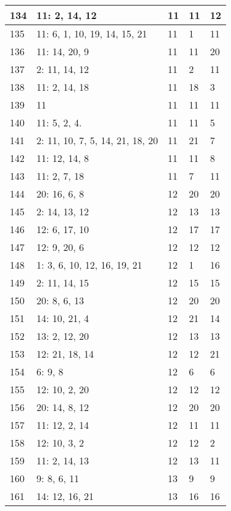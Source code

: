 \documentclass{article} %
\begin{document}
\begin{longtable}{| l | l | l | l | l |}
        134 & 11: 2, 14, 12 & 11 & 11 & 12 \\ \hline
        135 & 11: 6, 1, 10, 19, 14, 15, 21 & 11 & 1 & 11 \\ \hline
        136 & 11: 14, 20, 9 & 11 & 11 & 20 \\ \hline
        137 & 2: 11, 14, 12 & 11 & 2 & 11 \\ \hline
        138 & 11: 2, 14, 18 & 11 & 18 & 3 \\ \hline
        139 & 11 & 11 & 11 & 11 \\ \hline
        140 & 11: 5, 2, 4. & 11 & 11 & 5 \\ \hline
        141 & 2: 11, 10, 7, 5, 14, 21, 18, 20 & 11 & 21 & 7 \\ \hline
        142 & 11: 12, 14, 8 & 11 & 11 & 8 \\ \hline
        143 & 11: 2, 7, 18 & 11 & 7 & 11 \\ \hline
        144 & 20: 16, 6, 8 & 12 & 20 & 20 \\ \hline
        145 & 2: 14, 13, 12 & 12 & 13 & 13 \\ \hline
        146 & 12: 6, 17, 10 & 12 & 17 & 17 \\ \hline
        147 & 12: 9, 20, 6 & 12 & 12 & 12 \\ \hline
        148 & 1: 3, 6, 10, 12, 16, 19, 21 & 12 & 1 & 16 \\ \hline
        149 & 2: 11, 14, 15 & 12 & 15 & 15 \\ \hline
        150 & 20: 8, 6, 13 & 12 & 20 & 20 \\ \hline
        151 & 14: 10, 21, 4 & 12 & 21 & 14 \\ \hline
        152 & 13: 2, 12, 20 & 12 & 13 & 13 \\ \hline
        153 & 12: 21, 18, 14 & 12 & 12 & 21 \\ \hline
        154 & 6: 9, 8 & 12 & 6 & 6 \\ \hline
        155 & 12: 10, 2, 20 & 12 & 12 & 12 \\ \hline
        156 & 20: 14, 8, 12 & 12 & 20 & 20 \\ \hline
        157 & 11: 12, 2, 14 & 12 & 11 & 11 \\ \hline
        158 & 12: 10, 3, 2 & 12 & 12 & 2 \\ \hline
        159 & 11: 2, 14, 13 & 12 & 13 & 11 \\ \hline
        160 & 9: 8, 6, 11 & 13 & 9 & 9 \\ \hline
        161 & 14: 12, 16, 21 & 13 & 16 & 16 \\ \hline

\end{longtable}
\end{document}
